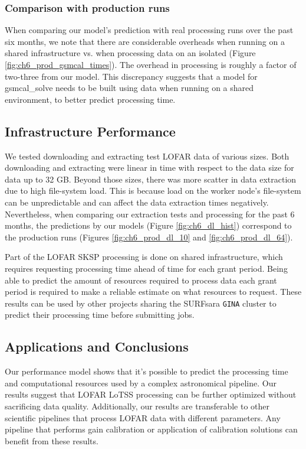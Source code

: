 \subsubsection{Comparison with production runs}

When comparing our model's prediction with real processing runs over the past six months, we note that there are considerable overheads when running on a shared infrastructure vs.  when processing data on an isolated (Figure \ref{fig:ch6_prod_gsmcal_times}). The overhead in processing is roughly a factor of two-three from our model. This discrepancy suggests that a model for {\selectfont gsmcal\_solve} needs to be built using data when running on a shared environment, to better predict processing time. 

\subsection{Infrastructure Performance}
We tested downloading and extracting test LOFAR data of various sizes. Both downloading and extracting were linear in time with respect to the data size for data up to 32 GB. Beyond those sizes, there was more scatter in data extraction due to high file-system load. This is because load on the worker node's file-system can be unpredictable and can affect the data extraction times negatively. Nevertheless, when comparing our extraction tests and processing for the past 6 months, the predictions by our models (Figure \ref{fig:ch6_dl_hist}) correspond to the production runs (Figures \ref{fig:ch6_prod_dl_10} and \ref{fig:ch6_prod_dl_64}).  


Part of the LOFAR SKSP processing is done on shared infrastructure, which requires requesting processing time ahead of time for each grant period. Being able to predict the amount of resources required to process data each grant period is required to make a reliable estimate on what resources to request. These results can be used by other projects sharing the SURFsara \texttt{GINA} cluster to predict their processing time before submitting jobs. 

\subsection{Applications and Conclusions}

Our performance model shows that it's possible to predict the processing time and computational resources used by a complex astronomical pipeline. Our results suggest that LOFAR LoTSS processing can be further optimized without sacrificing data quality. Additionally, our results are transferable to other scientific pipelines that process LOFAR data with different parameters.  Any pipeline that performs gain calibration or application of calibration solutions can benefit from these results. 

